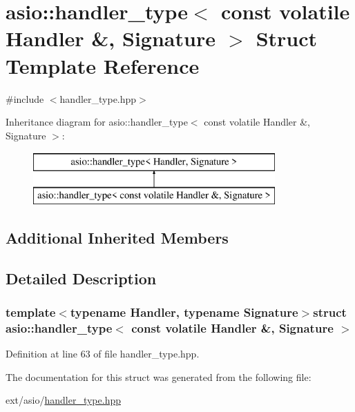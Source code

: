 \hypertarget{structasio_1_1handler__type_3_01const_01volatile_01_handler_01_6_00_01_signature_01_4}{}\section{asio\+:\+:handler\+\_\+type$<$ const volatile Handler \&, Signature $>$ Struct Template Reference}
\label{structasio_1_1handler__type_3_01const_01volatile_01_handler_01_6_00_01_signature_01_4}


{\ttfamily \#include $<$handler\+\_\+type.\+hpp$>$}

Inheritance diagram for asio\+:\+:handler\+\_\+type$<$ const volatile Handler \&, Signature $>$\+:\begin{figure}[H]
\begin{center}
\leavevmode
\includegraphics[height=2.000000cm]{structasio_1_1handler__type_3_01const_01volatile_01_handler_01_6_00_01_signature_01_4}
\end{center}
\end{figure}
\subsection*{Additional Inherited Members}


\subsection{Detailed Description}
\subsubsection*{template$<$typename Handler, typename Signature$>$struct asio\+::handler\+\_\+type$<$ const volatile Handler \&, Signature $>$}



Definition at line 63 of file handler\+\_\+type.\+hpp.



The documentation for this struct was generated from the following file\+:\begin{DoxyCompactItemize}
\item 
ext/asio/\hyperlink{handler__type_8hpp}{handler\+\_\+type.\+hpp}\end{DoxyCompactItemize}

